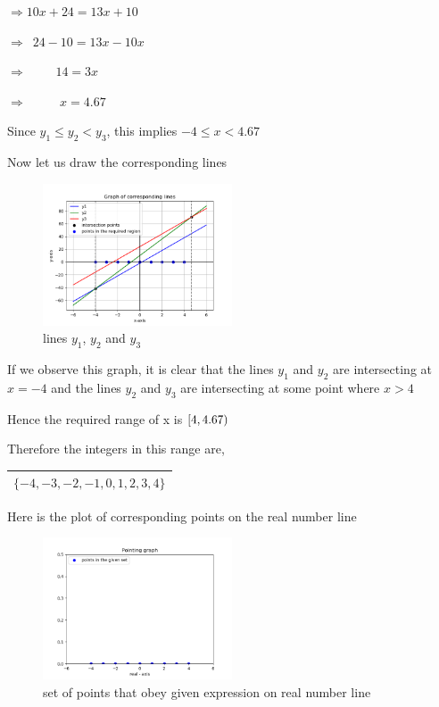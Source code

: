 \documentclass[16pt, a4paper, two column]{article}
\begin{document}
$\Rightarrow 10x + 24 = 13x + 10$

$\Rightarrow \hspace{6pt} 24 - 10 = 13x - 10x$

$\Rightarrow \hspace{28pt} 14 = 3x$

$\Rightarrow \hspace{32pt} x = 4.67$


Since $y_1 \leq y_2 < y_3$, this implies $-4 \leq x < 4.67$
\vspace{16pt}


\noindent Now let us draw the corresponding lines

\begin{figure}[h]
    \centering
    \includegraphics[width = 0.5\textwidth]{Figure_1}
    \caption{lines $y_1$, $y_2$ and $y_3$}
    \label{fig:mesh1}
\end{figure}

\vspace{16pt}

If we observe this graph, it is clear that the lines $y_1$ and $y_2$ are intersecting at $x = -4$ and the lines $y_2$ and $y_3$ are intersecting at some point where $x>4$

Hence the required range of x is $[\-4, 4.67)\ $\newline


\vspace{10pt}
\noindent Therefore the integers in this range are,

\begin{center}
\begin{tabular}{|c|}
\hline
\textbf{$ \{ -4, -3, -2, -1, 0, 1, 2, 3, 4\}$} \\
\hline
\end{tabular}
\end{center}


\noindent Here is the plot of corresponding points on the real number line\\
\begin{figure}[h]
    \centering
    \includegraphics[width = 0.5\textwidth]{Figure_2}
    \caption{set of points that obey given expression on real number line}
    \label{fig:mesh1}
\end{figure}
\end{document}
